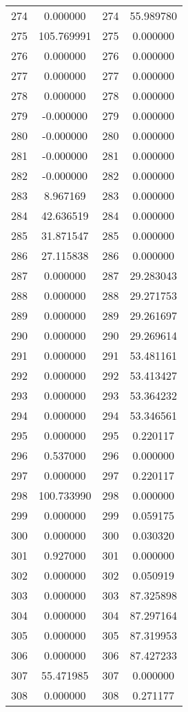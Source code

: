 \documentclass[12pt]{article}
\begin{document}
\begin{longtable}{@{}cccc@{}}
274 & 0.000000 & 274 & 55.989780 \\
275 & 105.769991 & 275 & 0.000000 \\
276 & 0.000000 & 276 & 0.000000 \\
277 & 0.000000 & 277 & 0.000000 \\
278 & 0.000000 & 278 & 0.000000 \\
279 & -0.000000 & 279 & 0.000000 \\
280 & -0.000000 & 280 & 0.000000 \\
281 & -0.000000 & 281 & 0.000000 \\
282 & -0.000000 & 282 & 0.000000 \\
283 & 8.967169 & 283 & 0.000000 \\
284 & 42.636519 & 284 & 0.000000 \\
285 & 31.871547 & 285 & 0.000000 \\
286 & 27.115838 & 286 & 0.000000 \\
287 & 0.000000 & 287 & 29.283043 \\
288 & 0.000000 & 288 & 29.271753 \\
289 & 0.000000 & 289 & 29.261697 \\
290 & 0.000000 & 290 & 29.269614 \\
291 & 0.000000 & 291 & 53.481161 \\
292 & 0.000000 & 292 & 53.413427 \\
293 & 0.000000 & 293 & 53.364232 \\
294 & 0.000000 & 294 & 53.346561 \\
295 & 0.000000 & 295 & 0.220117 \\
296 & 0.537000 & 296 & 0.000000 \\
297 & 0.000000 & 297 & 0.220117 \\
298 & 100.733990 & 298 & 0.000000 \\
299 & 0.000000 & 299 & 0.059175 \\
300 & 0.000000 & 300 & 0.030320 \\
301 & 0.927000 & 301 & 0.000000 \\
302 & 0.000000 & 302 & 0.050919 \\
303 & 0.000000 & 303 & 87.325898 \\
304 & 0.000000 & 304 & 87.297164 \\
305 & 0.000000 & 305 & 87.319953 \\
306 & 0.000000 & 306 & 87.427233 \\
307 & 55.471985 & 307 & 0.000000 \\
308 & 0.000000 & 308 & 0.271177 \\

\end{longtable}
\end{document}
